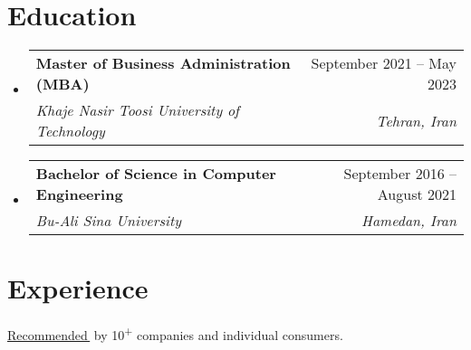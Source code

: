 \documentclass[11pt,a4paper]{article}
\makeatletter
\let\orighref\href
\renewcommand{\href}[2]{\orighref{#1}{#2\,{\textsuperscript{\tiny{\faExternalLink}}}}}
\newcommand{\deemph}[1]{{\color{black!40}#1}}
\newcommand{\resumeSubheading}[4]{
  \vspace{-2pt}\item
    \begin{tabular*}{0.97\textwidth}[t]{l@{\extracolsep{\fill}}r}
      \textbf{#1} & \small\deemph{#2} \\
      \textit{\small#3} & \textit{\small\deemph{#4}} \\
    \end{tabular*}\vspace{-7pt}
}
\newcommand{\resumeSubHeadingListStart}{\begin{itemize}[leftmargin=0.15in, label={}]}
\newcommand{\resumeSubHeadingListEnd}{\end{itemize}}
\makeatother
\begin{document}
\begin{justify}


\section{Education}
  \resumeSubHeadingListStart
    \resumeSubheading
      {Master of Business Administration (MBA)}{September 2021 -- May 2023}
      {Khaje Nasir Toosi University of Technology}{Tehran, Iran}
    \resumeSubheading
      {Bachelor of Science in Computer Engineering}{September 2016 -- August 2021}
      {Bu-Ali Sina University}{Hamedan, Iran}
  \resumeSubHeadingListEnd

\section{Experience}
    \begin{small}
    \href{https://kouy.ir/recommendation}{Recommended} by 10\textsuperscript{+} companies and individual consumers.
    \end{small}


\end{justify}
\end{document}
